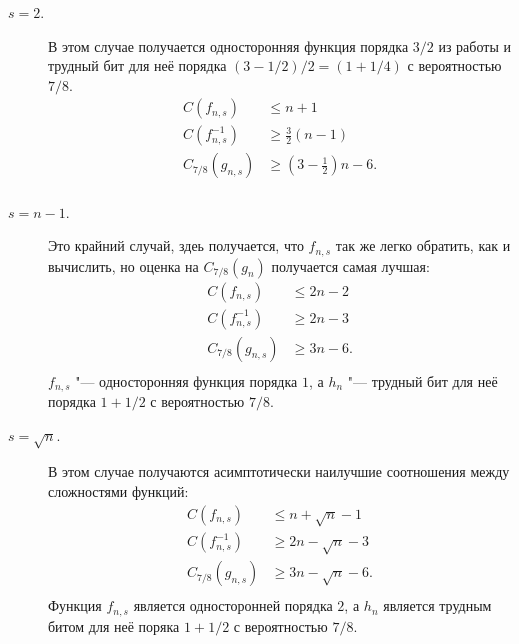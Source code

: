 \documentclass[a4paper, 14pt]{extarticle}
\begin{document}
\begin{description}
\item[$s = 2$.] В этом случае получается односторонняя функция порядка $3/2$ из
работы \cite{hiltgen1993} и трудный бит для неё порядка $(3 - 1/2) / 2 = (1 +
1/4)$ с вероятностью $7/8$.
\[
\begin{aligned}
C(f_{n, s}) &\leq n + 1 \\
C(f_{n, s}^{-1}) &\geq \frac 3 2 (n - 1) \\
C_{7/8}(g_{n, s}) &\geq (3 - \frac 1 2)n - 6. \\
\end{aligned}
\]
\item[$s = n - 1$.] Это крайний случай, здеь получается, что $f_{n, s}$ так же
легко обратить, как и вычислить, но оценка на $C_{7/8}(g_n)$ получается самая
лучшая:
\[
\begin{aligned}
C(f_{n, s}) &\leq 2n - 2 \\
C(f_{n, s}^{-1}) &\geq 2n - 3 \\
C_{7/8}(g_{n, s}) &\geq 3n - 6. \\
\end{aligned}
\]
$f_{n,s}$ "--- односторонняя функция порядка $1$, а $h_{n}$ "--- трудный бит для
неё порядка $1 + 1/2$ с вероятностью $7/8$.
\item[$s = \sqrt{n}$.] В этом случае получаются асимптотически наилучшие
соотношения между сложностями функций:
\[
\begin{aligned}
C(f_{n, s}) &\leq n + \sqrt{n} - 1 \\
C(f_{n, s}^{-1}) &\geq 2n - \sqrt n - 3 \\
C_{7/8}(g_{n, s}) &\geq 3n - \sqrt{n} - 6. \\
\end{aligned}
\]
Функция $f_{n, s}$ является односторонней порядка $2$, а $h_{n}$ является
трудным битом для неё поряка $1 + 1/2$ с вероятностью $7/8$.
\end{description}

{}

\end{document}
